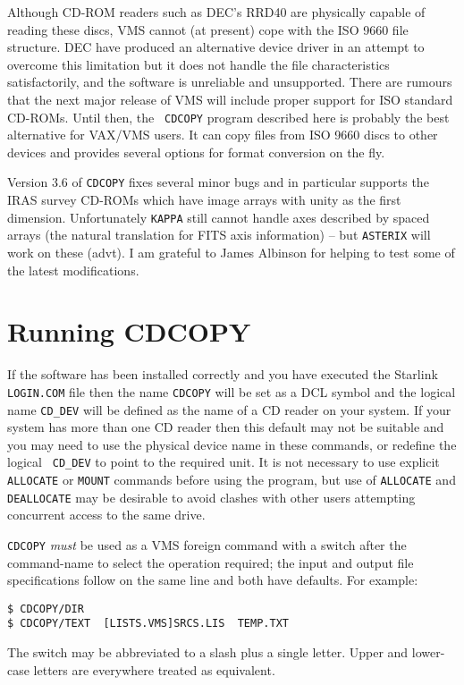 Although CD-ROM readers such as DEC's RRD40 are physically capable of
reading these discs, VMS cannot (at present) cope with the ISO 9660 file
structure. DEC have produced an alternative device driver in an attempt
to overcome this limitation but it does not handle the file
characteristics satisfactorily, and the software is unreliable and
unsupported. There are rumours that the next major release of VMS will
include proper support for ISO standard CD-ROMs. Until then, the {\tt
CDCOPY} program described here is probably the best alternative for
VAX/VMS users. It can copy files from ISO 9660 discs to other devices
and provides several options for format conversion on the fly. 

Version 3.6 of {\tt CDCOPY} fixes several minor bugs and in particular
supports the IRAS survey CD-ROMs which have image arrays with unity as
the first dimension. Unfortunately {\tt KAPPA} still cannot handle axes
described by spaced arrays (the natural translation for FITS axis 
information) -- but {\tt ASTERIX} will work on these (advt).
I am grateful to James Albinson for helping to test some of the latest
modifications. 

\section{Running CDCOPY} 

If the software has been installed correctly and you have executed the
Starlink {\tt LOGIN.COM} file then the name {\tt CDCOPY} will be set as
a DCL symbol and the logical name {\tt CD\_DEV} will be defined as the
name of a CD reader on your system. If your system has more than one CD
reader then this default may not be suitable and you may need to use the
physical device name in these commands, or redefine the logical {\tt
CD\_DEV} to point to the required unit.  It is not necessary to use
explicit {\tt ALLOCATE} or {\tt MOUNT} commands before using the 
program, but use of {\tt ALLOCATE} and {\tt DEALLOCATE} may be desirable
to avoid clashes with other users attempting concurrent access to the 
same drive.

{\tt CDCOPY} {\em must} be used as a VMS foreign command with a switch
after the command-name to select the operation required; the input and
output file specifications follow on the same line and both have
defaults.  For example: 
\begin{verbatim}
$ CDCOPY/DIR
$ CDCOPY/TEXT  [LISTS.VMS]SRCS.LIS  TEMP.TXT
\end{verbatim}
The switch may be abbreviated to a slash plus a single letter. Upper and
lower-case letters are everywhere treated as equivalent.

